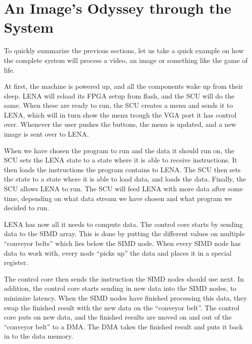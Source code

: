 \section{An Image's Odyssey through the System}

To quickly summarize the previous sections, let us take a quick example on how
the complete system will process a video, an image or something like the game of
life.

At first, the machine is powered up, and all the components wake up from their
sleep. \ac{LENA} will reload its \ac{FPGA} setup from flash, and the \ac{SCU}
will do the same. When these are ready to run, the \ac{SCU} creates a menu and
sends it to \ac{LENA}, which will in turn show the menu trough the \ac{VGA} port
it has control over. Whenever the user pushes the buttons, the menu is updated,
and a new image is sent over to \ac{LENA}.

When we have chosen the program to run and the data it should run on, the
\ac{SCU} sets the \ac{LENA} state to a state where it is able to receive
instructions. It then loads the instructions the program contains to
\ac{LENA}. The \ac{SCU} then sets the state to a state where it is able to load
data, and loads the data. Finally, the \ac{SCU} allows \ac{LENA} to run. The
  \ac{SCU} will feed \ac{LENA} with more data after some time, depending on what
  data stream we have chosen and what program we decided to run.

\ac{LENA} has now all it needs to compute data.  The control core starts by sending data to the
\ac{SIMD} array. This is done by putting the different values on multiple
``conveyor belts'' which lies below the \ac{SIMD} node.  When every
\ac{SIMD} node has data to work with, every node ``picks up'' the data and
places it in a special register.



The control core then sends the instruction the \ac{SIMD} nodes should use
next. In addition, the control core starts sending in new data into the
\ac{SIMD} nodes, to minimize latency. When the \ac{SIMD} nodes have finished
processing this data, they swap the finished result with the new data on the
``conveyor belt''. The control core puts on new data, and the finished results
are moved on and out of the ``conveyor belt'' to a \ac{DMA}. The \ac{DMA} takes
the finished result and puts it back in to the data memory. 

